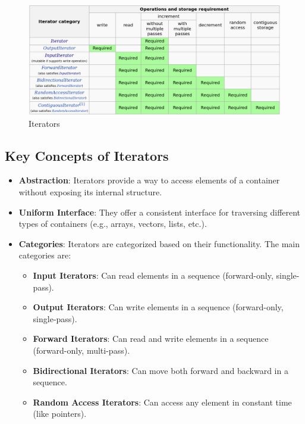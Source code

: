 \begin{figure}[H]
    \centering
    \includegraphics[width=\textwidth]{assets/iterators.png}
    \caption{Iterators}
\end{figure}

\subsection*{Key Concepts of Iterators}
\begin{itemize}
    \item \textbf{Abstraction}: Iterators provide a way to access elements of a container without exposing its internal structure.
    \item \textbf{Uniform Interface}: They offer a consistent interface for traversing different types of containers (e.g., arrays, vectors, lists, etc.).
    \item \textbf{Categories}: Iterators are categorized based on their functionality. The main categories are:
    \begin{itemize}
        \item \textbf{Input Iterators}: Can read elements in a sequence (forward-only, single-pass).
        \item \textbf{Output Iterators}: Can write elements in a sequence (forward-only, single-pass).
        \item \textbf{Forward Iterators}: Can read and write elements in a sequence (forward-only, multi-pass).
        \item \textbf{Bidirectional Iterators}: Can move both forward and backward in a sequence.
        \item \textbf{Random Access Iterators}: Can access any element in constant time (like pointers).
    \end{itemize}
\end{itemize}

